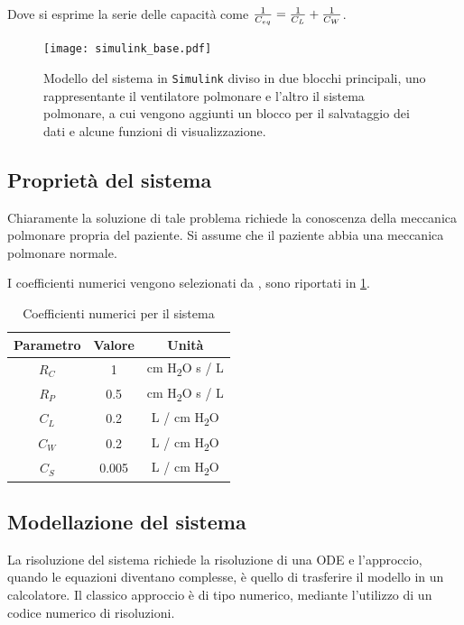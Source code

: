 Dove si esprime la serie delle capacità come ${1\over C_{eq}}={1\over C_{L}}+{1\over C_{W}}$. 


\begin{figure}[t!]
	\centering
	\texttt{[image: simulink\_base.pdf]}
	\caption{Modello del sistema in  \texttt{Simulink} diviso in due blocchi principali, uno rappresentante il ventilatore polmonare e l'altro il sistema polmonare, a cui vengono aggiunti un blocco per il salvataggio dei dati e alcune funzioni di visualizzazione.}
	\label{fig:generale}
\end{figure}

\subsection{Proprietà del sistema}


Chiaramente la soluzione di tale problema richiede la conoscenza della meccanica polmonare propria del paziente. Si assume che il paziente abbia una meccanica polmonare normale.

I coefficienti numerici vengono selezionati da \citeauthor{khoo_physiological_2018} \cite{khoo_physiological_2018}, sono riportati in \cref{tab:coefficienti}.


\begin{table}[h!]
	\centering
	\begin{tabular}{|c|c|c|}
		\hline
		Parametro & Valore & Unità \\ \hline
		$R_C$ & 1 & cm H\textsubscript{2}O s / L \\ \hline
		$R_P$ & 0.5 & cm H\textsubscript{2}O s / L \\ \hline
		$C_L$ & 0.2 & L / cm  H\textsubscript{2}O \\ \hline
		$C_W$ & 0.2 & L / cm  H\textsubscript{2}O \\ \hline
		$C_S$ & 0.005 & L / cm  H\textsubscript{2}O \\ \hline
	\end{tabular}
\caption{Coefficienti numerici per il sistema \cite{khoo_physiological_2018}}
\label{tab:coefficienti}
\end{table}

\subsection{Modellazione del sistema}

La risoluzione del sistema richiede la risoluzione di una ODE e l'approccio, quando le equazioni diventano complesse, è quello di trasferire il modello in un calcolatore. Il classico approccio è di tipo numerico, mediante l'utilizzo di un codice numerico di risoluzioni.

